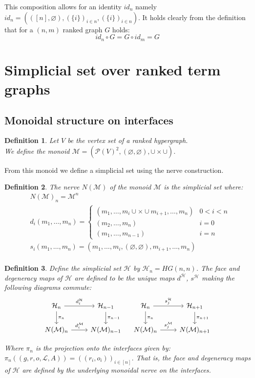 \documentclass[12pt]{article}
\newtheorem{definition}{Definition}[section]
\renewcommand{\P}{\mathcal{P}}
\newcommand{\1}{\mathbbm{1}}
\renewcommand{\L}{\mathcal{L}}
\newcommand{\M}{\mathcal{M}}
\renewcommand{\H}{\mathcal{H}}
\begin{document}
This composition allows for an identity $id_n$ namely $id_n = (([n], \varnothing), (\{i\})_{i\in n}, (\{i\})_{i\in n})$. It holds clearly from the definition that for a $(n,m)$ ranked graph $G$ holds: $$id_n \circ G = G \circ id_m = G$$
\newpage
\section{Simplicial set over ranked term graphs}
\subsection{Monoidal structure on interfaces}
\begin{definition}
    Let $V$ be the vertex set of a ranked hypergraph.\\
    We define the monoid $\M = (\P(V)^2, (\varnothing, \varnothing), \cup\times\cup)$. 
\end{definition}

From this monoid we define a simplicial set using the nerve construction.

\begin{definition}
    The \emph{nerve} $N(\M)$ of the monoid $\M$ is the simplicial set where:
    \begin{align*}
        &N(\M)_n = \M^n\\
        &d_i(m_1,\dots,m_n) = 
        \begin{cases}
            (m_1,\dots,m_i \cup\times\cup m_{i+1}, \dots, m_n) & 0 < i < n\\
            (m_2,\dots, m_n) & i = 0\\
            (m_1,\dots,m_{n-1}) & i = n
        \end{cases}\\
        &s_i(m_1,\dots,m_n) = (m_1, \dots, m_i, (\varnothing, \varnothing), m_{i+1}, \dots, m_n)\\
    \end{align*}
\end{definition}

\begin{definition}
Define the simplicial set $\H$ by $\H_n = HG(n,n)$. The face and degeneracy maps of $\H$ are defined to be the unique maps $d^{\H}$, $s^{\H}$ making the following diagrams commute:
\[
\begin{tikzcd}
\H_n \arrow{r}{d_i^{\H}} \arrow{d}{\pi_n} & \H_{n-1} \arrow{d}{\pi_{n-1}} \\
N(\M)_n \arrow{r}{d_i^\M} & N(\M)_{n-1}
\end{tikzcd}
\quad
\begin{tikzcd}
\H_n \arrow{r}{s_j^{\H}} \arrow{d}{\pi_n} & \H_{n+1} \arrow{d}{\pi_{n+1}} \\
N(\M)_n \arrow{r}{s_j^\M} & N(\M)_{n+1}
\end{tikzcd}
\]

Where $\pi_n$ is the projection onto the interfaces given by: $\pi_n((g, r, o, \L, A)) = ((r_i, o_i))_{i\in [n]}$. That is, the face and degeneracy maps of $\H$ are defined by the underlying monoidal nerve on the interfaces.
\end{definition}
\end{document}
